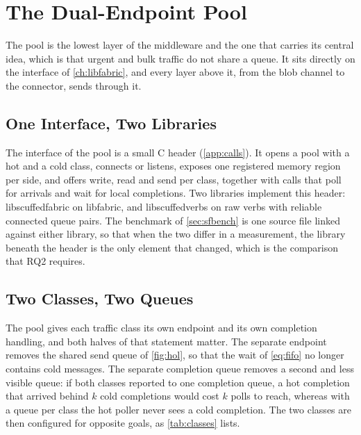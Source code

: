 
\section{The Dual-Endpoint Pool}
\label{sec:pool}

The pool is the lowest layer of the middleware and the one that carries its
central idea, which is that urgent and bulk traffic do not share a queue. It
sits directly on the interface of \cref{ch:libfabric}, and every layer above
it, from the blob channel to the connector, sends through it.

\subsection{One Interface, Two Libraries}

The interface of the pool is a small C header (\cref{app:calls}). It opens a
pool with a hot and a cold class, connects or listens, exposes one registered
memory region per side, and offers write, read and send per class, together
with calls that poll for arrivals and wait for local completions. Two
libraries implement this header: libscuffedfabric on libfabric, and
libscuffedverbs on raw verbs with reliable connected queue pairs. The
benchmark of \cref{sec:sfbench} is one source file linked against either
library, so that when the two differ in a measurement, the library beneath
the header is the only element that changed, which is the comparison that RQ2
requires.

\subsection{Two Classes, Two Queues}

The pool gives each traffic class its own endpoint and its own completion
handling, and both halves of that statement matter. The separate endpoint
removes the shared send queue of \cref{fig:hol}, so that the wait of
\cref{eq:fifo} no longer contains cold messages. The separate completion
queue removes a second and less visible queue: if both classes reported to
one completion queue, a hot completion that arrived behind $k$ cold
completions would cost $k$ polls to reach, whereas with a queue per class the
hot poller never sees a cold completion. The two classes are then configured
for opposite goals, as \cref{tab:classes} lists.

